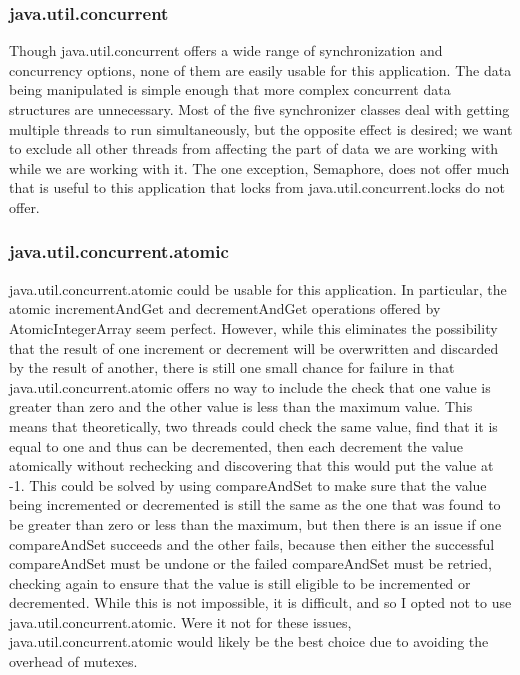 \documentclass[letterpaper,twocolumn,10pt]{article}
\begin{document}
\subsubsection{java.util.concurrent}
Though java.util.concurrent offers a wide range of synchronization and concurrency options, none of them are easily usable for this application. The data being manipulated is simple enough that more complex concurrent data structures are unnecessary. Most of the five synchronizer classes deal with getting multiple threads to run simultaneously, but the opposite effect is desired; we want to exclude all other threads from affecting the part of data we are working with while we are working with it. The one exception, Semaphore, does not offer much that is useful to this application that locks from java.util.concurrent.locks do not offer. \\
\subsubsection{java.util.concurrent.atomic}
java.util.concurrent.atomic could be usable for this application. In particular, the atomic incrementAndGet and decrementAndGet operations offered by AtomicIntegerArray seem perfect. However, while this eliminates the possibility that the result of one increment or decrement will be overwritten and discarded by the result of another, there is still one small chance for failure in that java.util.concurrent.atomic offers no way to include the check that one value is greater than zero and the other value is less than the maximum value. This means that theoretically, two threads could check the same value, find that it is equal to one and thus can be decremented, then each decrement the value atomically without rechecking and discovering that this would put the value at -1. This could be solved by using compareAndSet to make sure that the value being incremented or decremented is still the same as the one that was found to be greater than zero or less than the maximum, but then there is an issue if one compareAndSet succeeds and the other fails, because then either the successful compareAndSet must be undone or the failed compareAndSet must be retried, checking again to ensure that the value is still eligible to be incremented or decremented. While this is not impossible, it is difficult, and so I opted not to use java.util.concurrent.atomic. Were it not for these issues, java.util.concurrent.atomic would likely be the best choice due to avoiding the overhead of mutexes. \\
\end{document}
